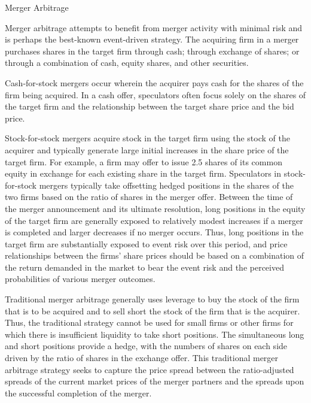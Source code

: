 \documentclass[11pt]{article}
\begin{document}
Merger Arbitrage

Merger arbitrage attempts to benefit from merger activity with minimal risk and is perhaps the best-known event-driven strategy. The acquiring firm in a merger purchases shares in the target firm through cash; through exchange of shares; or through a combination of cash, equity shares, and other securities.

Cash-for-stock mergers occur wherein the acquirer pays cash for the shares of the firm being acquired. In a cash offer, speculators often focus solely on the shares of the target firm and the relationship between the target share price and the bid price.

Stock-for-stock mergers acquire stock in the target firm using the stock of the acquirer and typically generate large initial increases in the share price of the target firm. For example, a firm may offer to issue 2.5 shares of its common equity in exchange for each existing share in the target firm. Speculators in stock-for-stock mergers typically take offsetting hedged positions in the shares of the two firms based on the ratio of shares in the merger offer. Between the time of the merger announcement and its ultimate resolution, long positions in the equity of the target firm are generally exposed to relatively modest increases if a merger is completed and larger decreases if no merger occurs. Thus, long positions in the target firm are substantially exposed to event risk over this period, and price relationships between the firms' share prices should be based on a combination of the return demanded in the market to bear the event risk and the perceived probabilities of various merger outcomes.

Traditional merger arbitrage generally uses leverage to buy the stock of the firm that is to be acquired and to sell short the stock of the firm that is the acquirer. Thus, the traditional strategy cannot be used for small firms or other firms for which there is insufficient liquidity to take short positions. The simultaneous long and short positions provide a hedge, with the numbers of shares on each side driven by the ratio of shares in the exchange offer. This traditional merger arbitrage strategy seeks to capture the price spread between the ratio-adjusted spreads of the current market prices of the merger partners and the spreads upon the successful completion of the merger.
\end{document}
